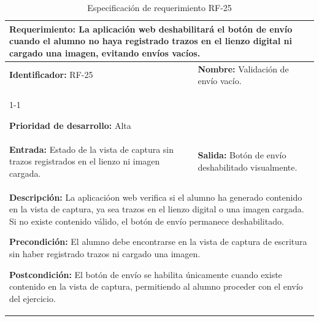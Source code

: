 \begin{longtable}{|p{7cm}|p{8cm}|}
\caption{Especificación de requerimiento RF-25}
\label{tab:rf25} \\ \hline

\multicolumn{2}{|p{15cm}|}{\textbf{Requerimiento:} La aplicación web deshabilitará el botón de envío cuando el alumno no haya registrado trazos en el lienzo digital ni cargado una imagen, evitando envíos vacíos.} \\ \hline

\textbf{Identificador:} RF-25 &
\textbf{Nombre:} Validación de envío vacío. \\ \cline{1-1}

\textbf{Prioridad de desarrollo:} Alta &
\multicolumn{1}{p{8cm}|}{} \\ \hline

\textbf{Entrada:} Estado de la vista de captura sin trazos registrados en el lienzo ni imagen cargada. &
\textbf{Salida:} Botón de envío deshabilitado visualmente. \\ \hline

\multicolumn{2}{|p{15cm}|}{
\textbf{Descripción:} La aplicacióon web verifica si el alumno ha generado contenido en la vista de captura, ya sea trazos en el lienzo digital o una imagen cargada. Si no existe contenido válido, el botón de envío permanece deshabilitado.

\vspace{0.2cm}
\textbf{Precondición:} El alumno debe encontrarse en la vista de captura de escritura sin haber registrado trazos ni cargado una imagen.

\vspace{0.2cm}
\textbf{Postcondición:} El botón de envío se habilita únicamente cuando existe contenido en la vista de captura, permitiendo al alumno proceder con el envío del ejercicio.
} \\ \hline

\end{longtable}

